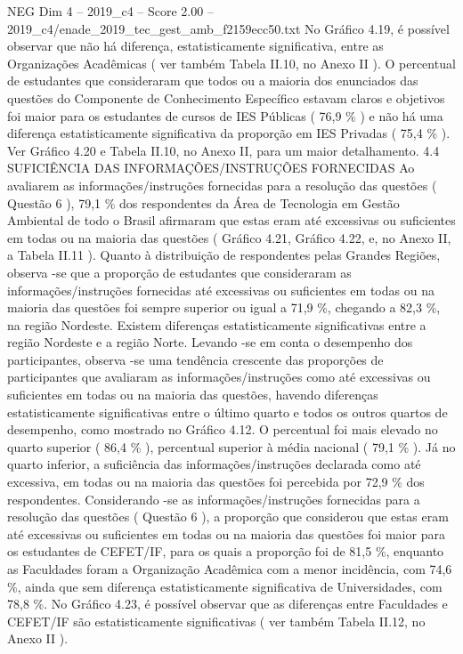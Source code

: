 \begin{textsample}{NEG Dim 4 – 2019\_c4 – Score 2.00 – 2019\_c4/enade\_2019\_tec\_gest\_amb\_f2159ecc50.txt}
No Gráfico 4.19, é possível observar que não há diferença, estatisticamente significativa, entre as Organizações Acadêmicas ( ver também Tabela II.10, no Anexo II ).
O percentual de estudantes que consideraram que todos ou a maioria dos enunciados das questões do Componente de Conhecimento Específico estavam claros e objetivos foi maior para os estudantes de cursos de IES Públicas ( 76,9 \% ) e não há uma diferença estatisticamente significativa da proporção em IES Privadas ( 75,4 \% ).
Ver Gráfico 4.20 e Tabela II.10, no Anexo II, para um maior detalhamento. 4.4 SUFICIÊNCIA DAS INFORMAÇÕES/INSTRUÇÕES FORNECIDAS Ao avaliarem as informações/instruções fornecidas para a resolução das questões ( Questão 6 ), 79,1 \% dos respondentes da Área de Tecnologia em Gestão Ambiental de todo o Brasil afirmaram que estas eram até excessivas ou suficientes em todas ou na maioria das questões ( Gráfico 4.21, Gráfico 4.22, e, no Anexo II, a Tabela II.11 ).
Quanto à distribuição de respondentes pelas Grandes Regiões, observa -se que a proporção de estudantes que consideraram as informações/instruções fornecidas até excessivas ou suficientes em todas ou na maioria das questões foi sempre superior ou igual a 71,9 \%, chegando a 82,3 \%, na região Nordeste.
Existem diferenças estatisticamente significativas entre a região Nordeste e a região Norte.
Levando -se em conta o desempenho dos participantes, observa -se uma tendência crescente das proporções de participantes que avaliaram as informações/instruções como até excessivas ou suficientes em todas ou na maioria das questões, havendo diferenças estatisticamente significativas entre o último quarto e todos os outros quartos de desempenho, como mostrado no Gráfico 4.12.
O percentual foi mais elevado no quarto superior ( 86,4 \% ), percentual superior à média nacional ( 79,1 \% ).
Já no quarto inferior, a suficiência das informações/instruções declarada como até excessiva, em todas ou na maioria das questões foi percebida por 72,9 \% dos respondentes.
Considerando -se as informações/instruções fornecidas para a resolução das questões ( Questão 6 ), a proporção que considerou que estas eram até excessivas ou suficientes em todas ou na maioria das questões foi maior para os estudantes de CEFET/IF, para os quais a proporção foi de 81,5 \%, enquanto as Faculdades foram a Organização Acadêmica com a menor incidência, com 74,6 \%, ainda que sem diferença estatisticamente significativa de Universidades, com 78,8 \%.
No Gráfico 4.23, é possível observar que as diferenças entre Faculdades e CEFET/IF são estatisticamente significativas ( ver também Tabela II.12, no Anexo II ).

\end{textsample}
